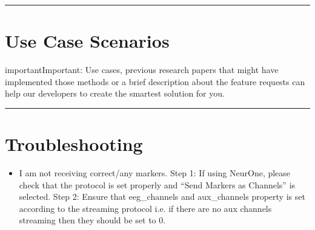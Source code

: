\documentclass[letterpaper,10pt,english]{sphinxmanual}
\begin{document}
\bigskip\hrule\bigskip



\section{Use Case Scenarios}
\label{\detokenize{7_issues_bugs_requests:use-case-scenarios}}
\begin{sphinxadmonition}{important}{Important:}
\sphinxAtStartPar
Use cases, previous research papers that might have implemented those methods or a brief description about the feature requests can help our developers to create the smartest solution for you.
\end{sphinxadmonition}


\bigskip\hrule\bigskip



\section{Troubleshooting}
\label{\detokenize{7_issues_bugs_requests:troubleshooting}}\begin{itemize}
\item {} 
\sphinxAtStartPar
I am not receiving correct/any markers.
\sphinxhyphen{}  Step 1: If using NeurOne, please check that the protocol is set properly and “Send Markers as Channels” is selected.
\sphinxhyphen{}  Step 2: Ensure that eeg\_channels and aux\_channels property is set according to the streaming protocol i.e. if there are no aux channels streaming then they should be set to 0.

\end{itemize}



\renewcommand{\indexname}{Index}
\printindex
\end{document}
